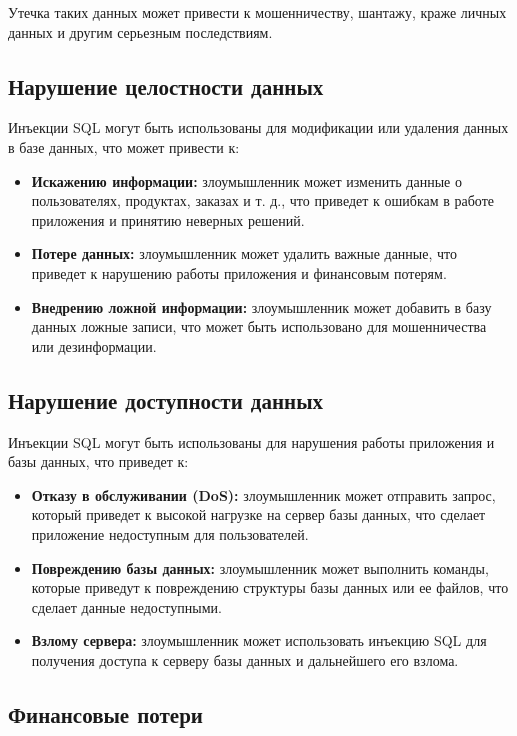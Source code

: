 \documentclass[a4paper,12pt]{diplom}
\begin{document}
	 Утечка таких данных может привести к мошенничеству, шантажу, краже личных данных и другим серьезным последствиям.
	 
	 \subsection{Нарушение целостности данных}
	 
	 Инъекции SQL могут быть использованы для модификации или удаления данных в базе данных, что может привести к:
	 
	 \begin{itemize}
	 	\item \textbf{Искажению информации:} злоумышленник может изменить данные о пользователях, продуктах, заказах и т. д., что приведет к ошибкам в работе приложения и принятию неверных решений.
	 	\item \textbf{Потере данных:} злоумышленник может удалить важные данные, что приведет к нарушению работы приложения и финансовым потерям.
	 	\item \textbf{Внедрению ложной информации:} злоумышленник может добавить в базу данных ложные записи, что может быть использовано для мошенничества или дезинформации. 
	 \end{itemize}
	 
	 \subsection{Нарушение доступности данных}
	 
	 Инъекции SQL могут быть использованы для нарушения работы приложения и базы данных, что приведет к:
	 
	 \begin{itemize}
	 	\item \textbf{Отказу в обслуживании (DoS):} злоумышленник может отправить запрос, который приведет к высокой нагрузке на сервер базы данных, что сделает приложение недоступным для пользователей.
	 	\item \textbf{Повреждению базы данных:} злоумышленник может выполнить команды, которые приведут к повреждению структуры базы данных или ее файлов, что сделает данные недоступными.
	 	\item \textbf{Взлому сервера:} злоумышленник может использовать инъекцию SQL для получения доступа к серверу базы данных и дальнейшего его взлома.
	 \end{itemize} 
	 
	 \subsection{Финансовые потери}
	 
\end{document}

